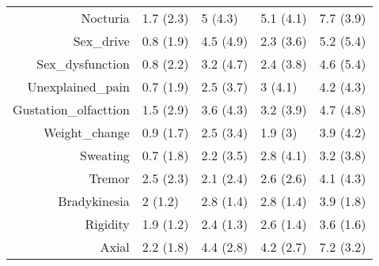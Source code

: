 \begin{table}[ht]
\begin{tabular}{rllll}
  Nocturia & 1.7 (2.3) & 5 (4.3) & 5.1 (4.1) & 7.7 (3.9) \\ 
  Sex\_drive & 0.8 (1.9) & 4.5 (4.9) & 2.3 (3.6) & 5.2 (5.4) \\ 
  Sex\_dysfunction & 0.8 (2.2) & 3.2 (4.7) & 2.4 (3.8) & 4.6 (5.4) \\ 
  Unexplained\_pain & 0.7 (1.9) & 2.5 (3.7) & 3 (4.1) & 4.2 (4.3) \\ 
  Gustation\_olfacttion & 1.5 (2.9) & 3.6 (4.3) & 3.2 (3.9) & 4.7 (4.8) \\ 
  Weight\_change & 0.9 (1.7) & 2.5 (3.4) & 1.9 (3) & 3.9 (4.2) \\ 
  Sweating & 0.7 (1.8) & 2.2 (3.5) & 2.8 (4.1) & 3.2 (3.8) \\ 
  Tremor & 2.5 (2.3) & 2.1 (2.4) & 2.6 (2.6) & 4.1 (4.3) \\ 
  Bradykinesia & 2 (1.2) & 2.8 (1.4) & 2.8 (1.4) & 3.9 (1.8) \\ 
  Rigidity & 1.9 (1.2) & 2.4 (1.3) & 2.6 (1.4) & 3.6 (1.6) \\ 
  Axial & 2.2 (1.8) & 4.4 (2.8) & 4.2 (2.7) & 7.2 (3.2) \\ 
   \bottomrule
\end{tabular}
\end{table}
